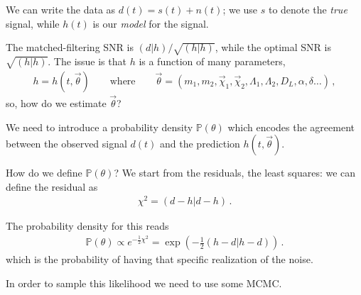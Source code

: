 \documentclass[main.tex]{subfiles}
\begin{document}

We can write the data as \(d(t) = s(t) + n(t)\); we use \(s\) to denote the \emph{true} signal, while \(h(t)\) is our \emph{model} for the signal. 

The matched-filtering SNR is \((d|h) / \sqrt{(h|h)}\), while the optimal SNR is \(\sqrt{(h|h)}\). 
The issue is that \(h\) is a function of many parameters, 
%
\begin{align}
h = h (t, \vec{\theta} ) 
\qquad \text{where} \qquad
\vec{\theta} = (m_1, m_2, \vec{\chi}_1, \vec{\chi}_2, \Lambda_1 , \Lambda_2 , D_L, \alpha , \delta \dots)
\,,
\end{align}
%
so, how do we estimate \(\vec{\theta}\)?

We need to introduce a probability density \(\mathbb{P}(\theta )\) which encodes the agreement between the observed signal \(d(t)\) and the prediction \(h(t, \vec{\theta})\). 

How do we define \(\mathbb{P}(\theta )\)? 
We start from the residuals, the least squares: we can define the residual as 
%
\begin{align}
\chi^2 = (d-h | d-h)
\,.
\end{align}

The probability density for this reads 
%
\begin{align}
\mathbb{P}(\theta ) \propto e^{- \frac{1}{2} \chi^2}
= \exp(- \frac{1}{2} (h-d | h-d))
\,.
\end{align}
%
which is the probability of having that specific realization of the noise. 

In order to sample this likelihood we need to use some MCMC.
\end{document}

